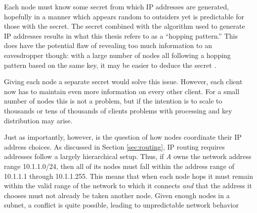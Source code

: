 \par Each node must know some secret from which \ac{IP} addresses are generated, hopefully in a manner which appears random to outsiders yet is predictable for those with the secret. The secret combined with the algorithm used to generate \ac{IP} addresses results in what this thesis refers to as a ``hopping pattern.''  This does have the potential flaw of revealing too much information to an eavesdropper though: with a large number of nodes all following a hopping pattern based on the same key, it may be easier to deduce the secret \cite{ShannonEntropy}.

\par Giving each node a separate secret would solve this issue. However, each client now has to maintain even more information on every other client. For a small number of nodes this is not a problem, but if the intention is to scale to thousands or tens of thousands of clients problems with processing and key distribution may arise.  

\par Just as importantly, however, is the question of how nodes coordinate their IP address choices. As discussed in Section \ref{sec:routing}, IP routing requires addresses follow a largely hierarchical setup. Thus, if \textit{A} owns the network address range 10.1.1.0/24, then all of its nodes must fall within the address range of 10.1.1.1 through 10.1.1.255. This means that when each node hops it must remain within the valid range of the network to which it connects \textit{and} that the address it chooses must not already be taken another node. Given enough nodes in a subnet, a conflict is quite possible, leading to unpredictable network behavior 


